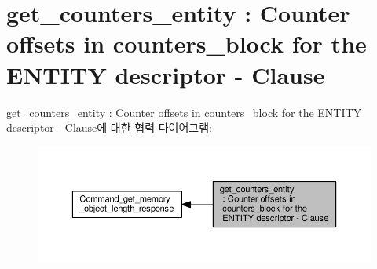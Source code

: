 \hypertarget{group__get__counters__entity}{}\section{get\+\_\+counters\+\_\+entity \+: Counter offsets in counters\+\_\+block for the E\+N\+T\+I\+TY descriptor -\/ Clause}
\label{group__get__counters__entity}
get\+\_\+counters\+\_\+entity \+: Counter offsets in counters\+\_\+block for the E\+N\+T\+I\+TY descriptor -\/ Clause에 대한 협력 다이어그램\+:
\nopagebreak
\begin{figure}[H]
\begin{center}
\leavevmode
\includegraphics[width=350pt]{group__get__counters__entity}
\end{center}
\end{figure}
